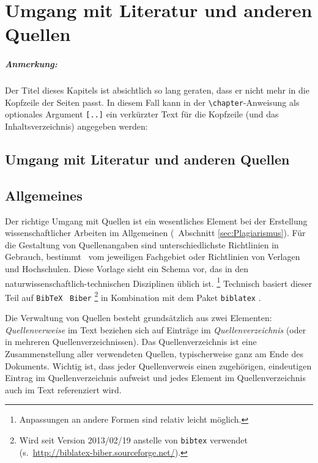 \chapter[Umgang mit Literatur]{Umgang mit Literatur und anderen Quellen}
\label{cha:Literatur}

\paragraph{Anmerkung:}
Der Titel dieses Kapitels ist absichtlich so
lang geraten, dass er nicht mehr in die Kopfzeile der Seiten passt. 
In diesem Fall kann in der \verb!\chapter!-Anweisung 
als optionales Argument \verb![..]! ein verkürzter Text für die
Kopfzeile (und das Inhaltsverzeichnis) angegeben werden:
%
\begin{LaTeXCode}[numbers=none]
\chapter[Umgang mit Literatur]{Umgang mit Literatur und anderen Quellen}
\end{LaTeXCode}

\section{Allgemeines}

Der richtige Umgang mit Quellen ist ein wesentliches Element bei der Erstellung
wissenschaftlicher Arbeiten im Allgemeinen (\sa\ Abschnitt \ref{sec:Plagiarismus}).
Für die Gestaltung von Quellenangaben sind unterschiedlichste Richtlinien in
Gebrauch, bestimmt \ua\ vom jeweiligen Fachgebiet oder Richtlinien von Verlagen und Hochschulen.
Diese Vorlage sieht ein Schema vor, das in den natur\-wissen\-schaftlich-technischen 
Disziplinen üblich ist.%
\footnote{Anpassungen an andere Formen sind relativ leicht möglich.}
Technisch basiert dieser Teil auf \texttt{BibTeX} \cite{Patashnik1988}
\bzw\ \texttt{Biber}%
\footnote{Wird seit Version 2013/02/19 anstelle von \texttt{bibtex} verwendet 
	(s.\ \url{http://biblatex-biber.sourceforge.net/}).}
in Kombination mit dem Paket \texttt{biblatex} \cite{Kime2020}.


Die Verwaltung von Quellen besteht grundsätzlich aus zwei Elementen: 
\emph{Quellenverweise} im Text beziehen sich auf Einträge im \emph{Quellenverzeichnis}
(oder in mehreren Quellenverzeichnissen).
Das Quellenverzeichnis ist eine
Zusammenstellung aller verwendeten Quellen, typischerweise ganz am Ende des Dokuments.
Wichtig ist, dass jeder Quellenverweis einen zugehörigen, eindeutigen
Eintrag im Quellenverzeichnis aufweist und jedes Element im Quellenverzeichnis auch
im Text referenziert wird.



